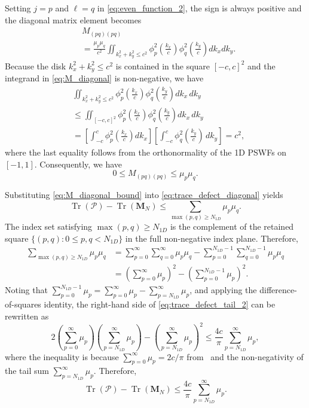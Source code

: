 \documentclass[lettersize,journal]{IEEEtran}
\theoremstyle{plain}
\begin{document}
Setting $j=p$ and $\ell=q$ in
\eqref{eq:even_function_2}, the sign is always positive and
the diagonal matrix element becomes
\begin{align}
	&M_{(pq)(pq)}\nonumber \\
	&=
	\frac{\mu_p\mu_q}{c^2}
	\iint_{k_x^2+k_y^2\leq c^2}
	\phi_p^2\left(\frac{k_x}{c}\right)
	\phi_q^2\left(\frac{k_y}{c}\right)
	dk_xdk_y.
	\label{eq:M_diagonal}
\end{align}
Because the disk $k_x^2+k_y^2\leq c^2$ is contained in the
square $[-c,c]^2$ and the integrand in
\eqref{eq:M_diagonal} is non-negative, we have
\begin{align}
	&\iint_{k_x^2+k_y^2\leq c^2}
	\phi_p^2\left(\frac{k_x}{c}\right)
	\phi_q^2\left(\frac{k_y}{c}\right)
	dk_x \, dk_y
	\nonumber\\
	& \leq\iint_{[-c,c]^2}
	\phi_p^2\left(\frac{k_x}{c}\right)
	\phi_q^2\left(\frac{k_y}{c}\right)
	dk_x \, dk_y\nonumber \\
	&= \left[\int_{-c}^{c} \phi_p^2\left(\frac{k_x}{c}\right)dk_x\right]\left[\int_{-c}^{c} \phi_q^2\left(\frac{k_y}{c}\right)\, dk_y\right]
	=c^2, \nonumber
\end{align}
where the last equality follows from the orthonormality of the
1D PSWFs on $[-1,1]$. Consequently, we have
\begin{equation}
	0\leq M_{(pq)(pq)}
	\leq \mu_p\mu_q.
	\label{eq:M_diagonal_bound}
\end{equation}

Substituting \eqref{eq:M_diagonal_bound} into
\eqref{eq:trace_defect_diagonal} yields
$$
	\operatorname{Tr}(\mathcal{P})
	-
	\operatorname{Tr}(\mathbf{M}_N)
	\leq
	\sum_{\max(p,q)\geq N_{1D}}\mu_p\mu_q.
	\label{eq:trace_defect_tail_1}
$$
The index set satisfying $\max(p,q)\geq N_{1D}$ is the
complement of the retained square
$\{(p,q):0\leq p,q<N_{1D}\}$ in the full non-negative
index plane. Therefore,
\begin{align}
	\sum_{\max(p,q)\geq N_{1D}}\mu_p\mu_q
	&=
	\sum_{p=0}^{\infty}\sum_{q=0}^{\infty}\mu_p\mu_q
	-
	\sum_{p=0}^{N_{1D}-1}
	\sum_{q=0}^{N_{1D}-1}\mu_p\mu_q
	\nonumber\\
	&=
	\left(\sum_{p=0}^{\infty}\mu_p\right)^2
	-
	\left(\sum_{p=0}^{N_{1D}-1}\mu_p\right)^2.
	\label{eq:trace_defect_tail_2}
\end{align}
Noting that $\sum_{p=0}^{N_{1D}-1}\mu_p = \sum_{p=0}^{\infty}\mu_p - \sum_{p=N_{1D}}^\infty\mu_p$, and applying the difference-of-squares identity, the right-hand side of
\eqref{eq:trace_defect_tail_2} can be rewritten as
$$
	2
	\left(\sum_{p=0}^{\infty}\mu_p\right)
	\left(\sum_{p=N_{1D}}^{\infty}\mu_p\right)
	-
	\left(\sum_{p=N_{1D}}^{\infty}\mu_p\right)^2\leq
	\frac{4c}{\pi}
	\sum_{p=N_{1D}}^{\infty}\mu_p,
$$
where the inequality is because
$\sum_{p=0}^{\infty}\mu_p=2c/\pi$
from~\cite{Landau1962PSWF_PartIII} and the non-negativity of the tail sum \(\sum_{p=N_{1D}}^{\infty}\mu_p\).
Therefore,
\begin{equation}
	\operatorname{Tr}(\mathcal{P})
	-
	\operatorname{Tr}(\mathbf{M}_N)
	\leq
	\frac{4c}{\pi}
	\sum_{p=N_{1D}}^{\infty}\mu_p.
	\label{eq:trace_defect_1D_tail}
\end{equation}
\end{document}
